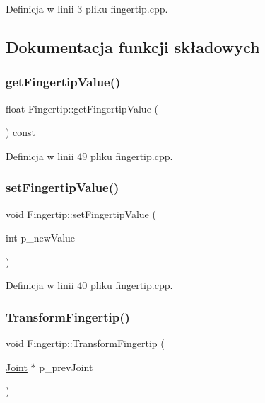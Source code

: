Definicja w linii 3 pliku fingertip.\+cpp.



\subsection{Dokumentacja funkcji składowych}
\mbox{\label{class_fingertip_a3ec55016e28f9fbce847baa668c44868}} 
\subsubsection{\texorpdfstring{get\+Fingertip\+Value()}{getFingertipValue()}}
{\footnotesize\ttfamily float Fingertip\+::get\+Fingertip\+Value (\begin{DoxyParamCaption}{ }\end{DoxyParamCaption}) const}



Definicja w linii 49 pliku fingertip.\+cpp.

\mbox{\label{class_fingertip_aa2823945458eb8a97f9568934bfcc1d5}} 
\subsubsection{\texorpdfstring{set\+Fingertip\+Value()}{setFingertipValue()}}
{\footnotesize\ttfamily void Fingertip\+::set\+Fingertip\+Value (\begin{DoxyParamCaption}\item[{int}]{p\+\_\+new\+Value }\end{DoxyParamCaption})}



Definicja w linii 40 pliku fingertip.\+cpp.

\mbox{\label{class_fingertip_aeecbae45b84b2ab9840df15b6541a21d}} 
\subsubsection{\texorpdfstring{Transform\+Fingertip()}{TransformFingertip()}}
{\footnotesize\ttfamily void Fingertip\+::\+Transform\+Fingertip (\begin{DoxyParamCaption}\item[{\hyperlink{class_joint}{Joint} $\ast$}]{p\+\_\+prev\+Joint }\end{DoxyParamCaption})}



